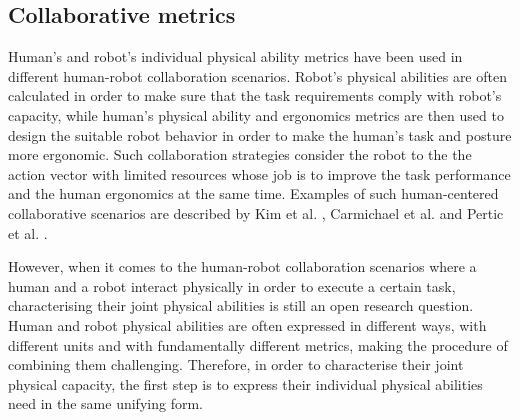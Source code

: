     

\subsection{Collaborative metrics}

Human's and robot's individual physical ability metrics have been used in different human-robot collaboration scenarios. Robot's physical abilities are often calculated in order to make sure that the task requirements comply with robot's capacity, while human's physical ability and ergonomics metrics are then used to design the suitable robot behavior in order to make the human's task and posture more ergonomic. Such collaboration strategies consider the robot to the the action vector with limited resources whose job is to improve the task performance and the human ergonomics at the same time. Examples of such human-centered collaborative scenarios are described by Kim et al. \cite{KIM2021102084}, Carmichael et al. \cite{carmichael2013admittance,carmichael_towards_2011} and Pertic et al. \cite{petric2019assistive}.

However, when it comes to the human-robot collaboration scenarios where a human and a robot interact physically in order to execute a certain task, characterising their joint physical abilities is still an open research question. Human and robot physical abilities are often expressed in different ways, with different units and with fundamentally different metrics, making the procedure of combining them challenging. Therefore, in order to characterise their joint physical capacity, the first step is to express their individual physical abilities need in the same unifying form. 

